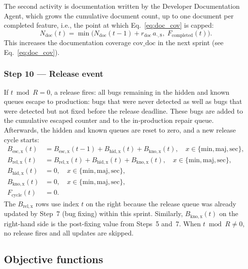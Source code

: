 \documentclass[smallextended]{svjour3}       %
\begin{document}
The second activity is documentation written by the Developer Documentation Agent, which grows the cumulative
document count, up to one document per completed feature, i.e., the point at which
Eq.~\eqref{eq:doc_cov} is capped:
\begin{equation}
  N_\mathrm{doc}(t) = \min\!\bigl(N_\mathrm{doc}(t-1) + r_\mathrm{doc}\,a_{\cdot,8},\;
    F_\mathrm{completed}(t)\bigr).
  \label{eq:ndoc_update}
\end{equation}
This increases the documentation coverage $\mathrm{cov\_doc}$ in the next
sprint (see Eq.~\eqref{eq:doc_cov}).

\subsubsection*{Step 10 --- Release event}
If $t \bmod R = 0$, a release fires: all bugs remaining in the hidden and known queues
escape to production: bugs that were never detected as well as bugs that were detected but not fixed before the release deadline.
These bugs are added to the cumulative escaped counter
and to the in-production repair queue. Afterwards, the hidden and known queues are reset to zero, and a new release cycle starts:
\begin{align}
  B_\mathrm{esc,x}(t)  &= B_\mathrm{esc,x}(t-1) + B_\mathrm{hid,x}(t) + B_\mathrm{kno,x}(t),
    \quad x \in \{\mathrm{min,maj,sec}\}, \nonumber \\
  B_\mathrm{rel,x}(t)  &= B_\mathrm{rel,x}(t)   + B_\mathrm{hid,x}(t) + B_\mathrm{kno,x}(t),
    \quad x \in \{\mathrm{min,maj,sec}\}, \nonumber \\
  B_\mathrm{hid,x}(t)  &= 0,
    \quad x \in \{\mathrm{min,maj,sec}\}, \nonumber \\
  B_\mathrm{kno,x}(t)  &= 0,
    \quad x \in \{\mathrm{min,maj,sec}\}, \nonumber \\
  F_\mathrm{cycle}(t) &= 0.
  \label{eq:release_update}
\end{align}
The $B_\mathrm{rel,x}$ rows use index $t$ on the right because the
release queue was already updated by Step~7 (bug fixing) within this sprint.
Similarly, $B_\mathrm{kno,x}(t)$ on the right-hand side is the post-fixing value from
Steps~5 and~7. When $t \bmod R \neq 0$, no release fires and all updates are skipped.

\subsection{Objective functions}
\label{sec:model:objectives}
\end{document}
